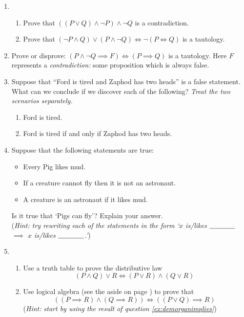 \begin{exercises}{}{}
\begin{enumerate}
  \item\begin{enumerate}
    \item Prove that $((P\vee Q)\wedge \neg P)\wedge\neg Q$ is a contradiction.
  	\item Prove that $(\neg P\wedge Q)\vee(P\wedge\neg Q)\iff\neg(P\iff Q)$ is a tautology.
  \end{enumerate}
  
  \item Prove or disprove: $(P\wedge \neg Q\implies F)\iff (P\implies Q)$ is a tautology. Here $F$ represents a \emph{contradiction:} some proposition which is always false.
	

  \item Suppose that ``Ford is tired and Zaphod has two heads'' is a false statement. What can we conclude if we discover each of the following? \emph{Treat the two scenarios separately.}
		\begin{enumerate}
	  	\item Ford is tired.
	  	\item Ford is tired if and only if Zaphod has two heads.
		\end{enumerate}
		
	\item Suppose that the following statements are true:
  \begin{itemize}
    \item Every Pig likes mud.
    \item If a creature cannot fly then it is not an astronaut.
    \item A creature is an astronaut if it likes mud.
  \end{itemize}
  Is it true that `Pigs can fly'? Explain your answer.\\
  (\emph{Hint: try rewriting each of the statements in the form `$x$ is/likes $\underline{\text{\phantom{bobobob}}}$ $\implies$ $x$ is/likes $\underline{\text{\phantom{bobobob}}}$.'})
  
	\item\begin{enumerate}
	  \item Use a truth table to prove the distributive law
		\[(P\wedge Q)\vee R\iff (P\vee R)\wedge(Q\vee R)\]
		\item Use logical algebra (see the aside on page \hyperlink{aside:logicalalglnk}{\pageref*{aside:logicalalg}}) to prove that
		\[\left((P\implies R)\wedge(Q\implies R)\right)\iff \left((P\vee Q)\implies R\right)\]
		(\emph{Hint: start by using the result of question \ref{ex:demorganimplies}})
	\end{enumerate}
	

\end{enumerate}
\end{exercises}
